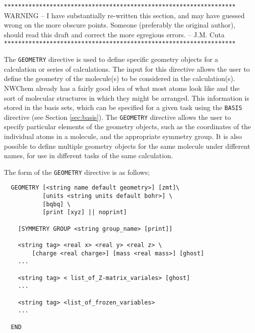 \label{sec:geom}

\verb+******************************************************************+
WARNING -- I have substantially re-written this section, and may have
guessed wrong on the more obscure points.  Someone (preferably the original
author), should read this draft and correct the more egregious 
errors. -- J.M. Cuta
\verb+******************************************************************+

The \verb+GEOMETRY+ directive is used to define specific geometry objects
for a calculation or series of calculations.  The input for this directive
allows the user to define the geometry of the molecule(s) to be considered
in the calculation(s).  NWChem already has a fairly good idea of what most
atoms look like and the sort of molecular structures in which they might be
arranged.  This information is stored in the basis sets, which can be specified
for a given task using the \verb+BASIS+ directive (see Section 
\ref{sec:basis}).  The \verb+GEOMETRY+ directive allows the user to specify
particular elements of the geometry objects, such as the coordinates of 
the individual atoms in a molecule, and the appropriate symmetry group.
It is also possible to define multiple geometry objects for the same
molecule under different names, for use in different tasks of the same 
calculation.

The form of the \verb+GEOMETRY+ directive is as follows;

\begin{verbatim}
  GEOMETRY [<string name default geometry>] [zmt]\
           [units <string units default bohr>] \
           [bqbq] \
           [print [xyz] || noprint]
    
    [SYMMETRY GROUP <string group_name> [print]]

    <string tag> <real x> <real y> <real z> \
        [charge <real charge>] [mass <real mass>] [ghost]
    ...

    <string tag> < list_of_Z-matrix_variales> [ghost]
    ...

    <string tag> <list_of_frozen_variables>
    ...

  END
\end{verbatim}


